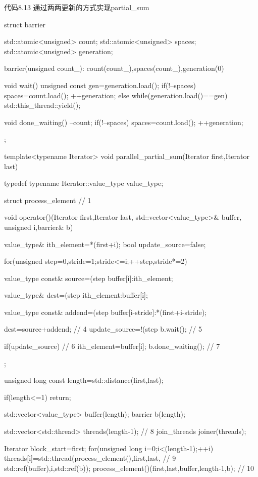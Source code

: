 代码8.13 通过两两更新的方式实现partial\_sum

\begin{cpp}
struct barrier
{
  std::atomic<unsigned> count;
  std::atomic<unsigned> spaces;
  std::atomic<unsigned> generation;

  barrier(unsigned count_):
    count(count_),spaces(count_),generation(0)
  {}

  void wait()
  {
    unsigned const gen=generation.load();
    if(!--spaces)
    {
      spaces=count.load();
      ++generation;
    }
    else
    {
      while(generation.load()==gen)
      {
        std::this_thread::yield();
      }
    }
  }

  void done_waiting()
  {
    --count;
    if(!--spaces)
    {
      spaces=count.load();
      ++generation;
    }
  }
};

template<typename Iterator>
void parallel_partial_sum(Iterator first,Iterator last)
{
  typedef typename Iterator::value_type value_type;

  struct process_element  // 1
  {
    void operator()(Iterator first,Iterator last,
                    std::vector<value_type>& buffer,
                    unsigned i,barrier& b)
    {
      value_type& ith_element=*(first+i);
      bool update_source=false;

      for(unsigned step=0,stride=1;stride<=i;++step,stride*=2)
      {
        value_type const& source=(step%
          buffer[i]:ith_element;

        value_type& dest=(step%
          ith_element:buffer[i];

        value_type const& addend=(step%
          buffer[i-stride]:*(first+i-stride);

        dest=source+addend;  // 4
        update_source=!(step%
        b.wait();  // 5
      }
      if(update_source)  // 6
      {
        ith_element=buffer[i];
      }
      b.done_waiting();  // 7
    }
  };

  unsigned long const length=std::distance(first,last);

  if(length<=1)
    return;

  std::vector<value_type> buffer(length);
  barrier b(length);

  std::vector<std::thread> threads(length-1);  // 8
  join_threads joiner(threads);

  Iterator block_start=first;
  for(unsigned long i=0;i<(length-1);++i)
  {
    threads[i]=std::thread(process_element(),first,last,  // 9
                           std::ref(buffer),i,std::ref(b));
  }
  process_element()(first,last,buffer,length-1,b);  // 10
}
\end{cpp}

